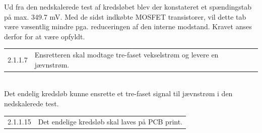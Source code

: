 Ud fra den nedskalerede test af kredsløbet blev der konstateret et spændingstab på max. 349.7 mV. Med de sidst indkøbte MOSFET transistorer, vil dette tab være væsentlig mindre pga. reduceringen af den interne modstand. Kravet anses derfor for at være opfyldt.\\

\vspace{1em}
\begin{tabular}[h]{ll}
2.1.1.7&Ensretteren skal modtage tre-faset vekselstrøm og levere en jævnstrøm.\vspace{0.5em}\\
\end{tabular}
\vspace{1em}\\


Det endelig kredsløb kunne ensrette et tre-faset signal til jævnstrøm i den nedskalerede test.\\



\vspace{1em}
\begin{tabular}[h]{ll}
2.1.1.15&Det endelige kredsløb skal laves på PCB print.\vspace{0.5em}\\
\end{tabular}
\vspace{1em}\\



